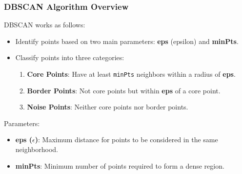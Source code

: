 \documentclass[aspectratio=169]{beamer}
\begin{document}
\begin{frame}[fragile]
    \frametitle{DBSCAN Algorithm Overview}
    DBSCAN works as follows:
    
    \begin{itemize}
        \item Identify points based on two main parameters: \textbf{eps} (epsilon) and \textbf{minPts}.
        \item Classify points into three categories:
        \begin{enumerate}
            \item \textbf{Core Points}: Have at least \texttt{minPts} neighbors within a radius of \textbf{eps}.
            \item \textbf{Border Points}: Not core points but within \textbf{eps} of a core point.
            \item \textbf{Noise Points}: Neither core points nor border points.
        \end{enumerate}
    \end{itemize}

    \begin{block}{Parameters:}
        \begin{itemize}
            \item \textbf{eps ($\epsilon$)}: Maximum distance for points to be considered in the same neighborhood.
            \item \textbf{minPts}: Minimum number of points required to form a dense region.
        \end{itemize}
    \end{block}
\end{frame}
\end{document}
